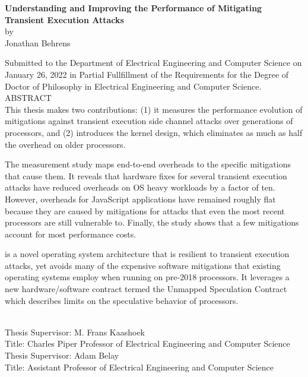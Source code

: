 
\singlespace
\begin{center}

{\large \bf Understanding and Improving the Performance of Mitigating Transient Execution Attacks} \\[.5\baselineskip]
by \\
Jonathan Behrens \\[.5\baselineskip]
\end{center}

Submitted to the Department of Electrical Engineering and Computer Science on January 26, 2022 in Partial Fullfillment of the Requirements for the Degree of Doctor of Philosophy in Electrical Engineering and Computer Science.\\[.5\baselineskip]

\noindent
ABSTRACT \\

This thesis makes two contributions:
(1) it measures the performance evolution of mitigations against transient execution side channel attacks over generations of processors, and (2) introduces the \sys kernel design, which eliminates as much as half the overhead on older processors.

The measurement study maps end-to-end overheads to the specific mitigations that cause them.
It reveals that hardware fixes for several transient execution attacks have reduced overheads on OS heavy workloads by a factor of ten.
However, overheads for JavaScript applications have remained roughly flat because they are caused by mitigations for attacks that even the most recent processors are still vulnerable to.
Finally, the study shows that a few mitigations account for most performance costs.


\sys is a novel operating system architecture that is resilient to transient execution attacks, yet avoids many of the expensive software mitigations that existing operating systems employ when running on pre-2018 processors.
It leverages a new hardware/software contract termed the Unmapped Speculation Contract which describes limits on the speculative behavior of processors.

~\\[\baselineskip]

\noindent
Thesis  Supervisor:  M.  Frans  Kaashoek \\
Title:  Charles  Piper  Professor  of Electrical  Engineering  and  Computer  Science \\[.5\baselineskip]
\noindent
Thesis  Supervisor:  Adam Belay \\
Title:  Assistant Professor  of Electrical  Engineering  and  Computer  Science \\

\doublespace